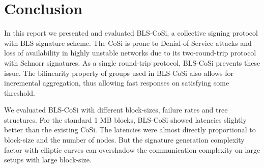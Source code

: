 \section{Conclusion}
\label{conclusion}
In this report we presented and evaluated BLS-CoSi, a collective signing protocol with BLS signature scheme. The CoSi is prone to Denial-of-Service attacks and loss of availability in highly unstable networks due to its two-round-trip protocol with Schnorr signatures. As a single round-trip protocol, BLS-CoSi prevents these issue. The bilinearity property of groups used in BLS-CoSi also allows for incremental aggregation, thus allowing fast responses on satisfying some threshold. 

We evaluated BLS-CoSi with different block-sizes, failure rates and tree structures. For the standard 1 MB blocks, BLS-CoSi showed latencies slightly better than the existing CoSi. The latencies were almost directly proportional to block-size and the number of nodes. But the signature generation complexity factor with elliptic curves can overshadow the communication complexity on large setups with large block-size.

\clearpage